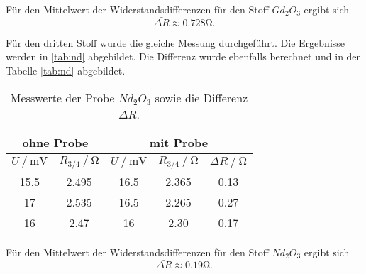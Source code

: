Für den Mittelwert der Widerstandsdifferenzen für den Stoff $Gd_2O_3$ ergibt sich
\begin{equation*}
  \bar{\Delta R} \approx 0.728 \si{\ohm}.
\end{equation*}

Für den dritten Stoff wurde die gleiche Messung durchgeführt. Die Ergebnisse werden in \eqref{tab:nd}
abgebildet. Die Differenz wurde ebenfalls berechnet und in der Tabelle \eqref{tab:nd} abgebildet.
\begin{table}
  \centering
  \caption{Messwerte der Probe $Nd_2O_3$ sowie die Differenz $\Delta R$.}
  \label{tab:nd}
\begin{tabular}{c c | c c | c}
  \hline
  \multicolumn{2}{c}{ohne Probe} & \multicolumn{3}{c}{mit Probe} \\
  \hline
  $U\mathbin{/} \si{\mV}$ & $R_{3/4}\mathbin{/} \si{\ohm}$ & $U\mathbin{/} \si{\mV}$ & $R_{3/4}\mathbin{/} \si{\ohm}$ & $\Delta R\mathbin{/}\si{\ohm}$ \\
  \hline
  15.5 & 2.495 & 16.5  & 2.365 & 0.13\\
  17  & 2.535 & 16.5  & 2.265 & 0.27\\
  16 & 2.47& 16 & 2.30 & 0.17\\
  \bottomrule
  \end{tabular}
\end{table}

Für den Mittelwert der Widerstandsdifferenzen für den Stoff $Nd_2O_3$ ergibt sich
\begin{equation*}
  \bar{\Delta R} \approx 0.19 \si{\ohm}.
\end{equation*}

